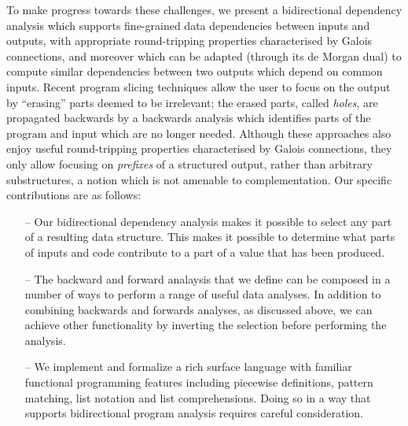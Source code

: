 To make progress towards these challenges, we present a bidirectional dependency analysis which supports fine-grained data dependencies between inputs and outputs, with appropriate round-tripping properties characterised by Galois connections, and moreover which can be adapted (through its de Morgan dual) to compute similar dependencies between two outputs which depend on common inputs. Recent program slicing techniques \cite{perera12a,perera13a,ricciotti17} allow the user to focus on the output by ``erasing'' parts deemed to be irrelevant; the erased parts, called \emph{holes}, are propagated backwards by a backwards analysis which identifies parts of the program and input which are no longer needed. Although these approaches also enjoy useful round-tripping properties characterised by Galois connections, they only allow focusing on \emph{prefixes} of a structured output, rather than arbitrary substructures, a notion which is not amenable to complementation. Our specific contributions are as follows:

\begin{itemize}
\item[--] Our bidirectional dependency analysis makes it possible to select any part of a resulting data structure. This makes it possible to determine what parts of inputs and code contribute to a part of a value that has been produced.
\item[--] The backward and forward analaysis that we define can be composed in a number of ways to perform a range of useful data analyses. In addition to combining backwards and forwards analyses, as discussed above, we can achieve other functionality by inverting the selection before performing the analysis.
\item[--] We implement and formalize a rich surface language with familiar functional programming features including piecewise definitions, pattern matching, list notation and list comprehensions. Doing so in a way that supports bidirectional program analysis requires careful consideration.
\end{itemize}

